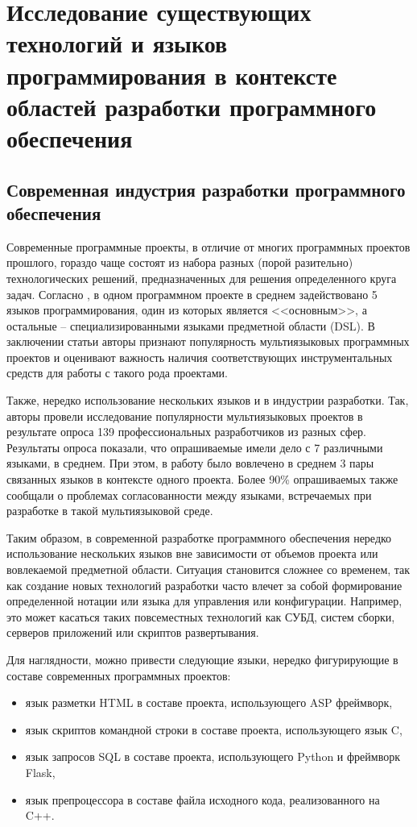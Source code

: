 \chapter{Исследование существующих технологий и языков программирования в контексте
областей разработки программного обеспечения} \label{sec:num1}

\section{Современная индустрия разработки программного обеспечения}

Современные программные проекты, в отличие от многих программных проектов прошлого,
гораздо чаще состоят из набора разных (порой разительно) технологических
решений, предназначенных для решения определенного круга задач. Согласно \cite{empirical-analysis},
в одном программном проекте в среднем задействовано 5 языков программирования, один из
которых является <<основным>>, а остальные -- специализированными языками предметной области (DSL).
В заключении статьи авторы признают популярность мультиязыковых программных проектов
и оценивают важность наличия соответствующих инструментальных средств для работы с
такого рода проектами.

Также, нередко использование нескольких языков и в индустрии разработки. Так, авторы \cite{professional-developers}
провели исследование популярности мультиязыковых проектов
в результате опроса 139 профессиональных разработчиков из разных сфер. 
Результаты опроса показали, что опрашиваемые имели дело с 7 различными языками, в среднем.
При этом, в работу было вовлечено в среднем 3 пары связанных языков в контексте одного проекта.
Более 90\% опрашиваемых также сообщали о проблемах согласованности между языками,
встречаемых при разработке в такой мультиязыковой среде. 

Таким образом, в современной разработке программного обеспечения нередко использование
нескольких языков вне зависимости от объемов проекта или вовлекаемой предметной области.
Ситуация становится сложнее со временем, так как создание новых технологий разработки
часто влечет за собой формирование определенной нотации или языка для управления или конфигурации.
Например, это может касаться таких повсеместных технологий как СУБД, систем сборки,
серверов приложений или скриптов развертывания.

Для наглядности, можно привести следующие языки, нередко фигурирующие в составе современных программных проектов:
\begin{itemize}    
    \item язык разметки HTML в составе проекта, использующего ASP фреймворк,
    \item язык скриптов командной строки в составе проекта, использующего язык C,
    \item язык запросов SQL в составе проекта, использующего Python и фреймворк Flask,
    \item язык препроцессора в составе файла исходного кода, реализованного на C++.
\end{itemize}

